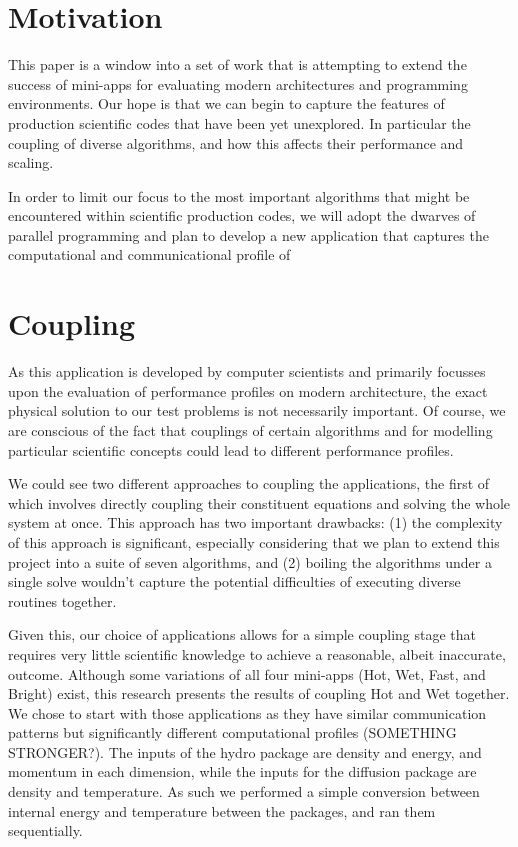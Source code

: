 \documentclass[runningheads,a4paper]{llncs}
\begin{document}
\section{Motivation}

This paper is a window into a set of work that is attempting to extend the success of mini-apps for evaluating modern architectures and programming environments. Our hope is that we can begin to capture the features of production scientific codes that have been yet unexplored. In particular the coupling of diverse algorithms, and how this affects their performance and scaling.

In order to limit our focus to the most important algorithms that might be encountered within scientific production codes, we will adopt the dwarves of parallel programming and plan to develop a new application that captures the computational and communicational profile of  

\section{Coupling}

As this application is developed by computer scientists and primarily focusses upon the evaluation of performance profiles on modern architecture, the exact physical solution to our test problems is not necessarily important. Of course, we are conscious of the fact that couplings of certain algorithms and for modelling particular scientific concepts could lead to different performance profiles.

We could see two different approaches to coupling the applications, the first of which involves directly coupling their constituent equations and solving the whole system at once. This approach has two important drawbacks: (1) the complexity of this approach is significant, especially considering that we plan to extend this project into a suite of seven algorithms, and (2) boiling the algorithms under a single solve wouldn't capture the potential difficulties of executing diverse routines together.

Given this, our choice of applications allows for a simple coupling stage that requires very little scientific knowledge to achieve a reasonable, albeit inaccurate, outcome. Although some variations of all four mini-apps (Hot, Wet, Fast, and Bright) exist, this research presents the results of coupling Hot and Wet together. We chose to start with those applications as they have similar communication patterns but significantly different computational profiles (SOMETHING STRONGER?). The inputs of the hydro package are density and energy, and momentum in each dimension, while the inputs for the diffusion package are density and temperature. As such we performed a simple conversion between internal energy and temperature between the packages, and ran them sequentially.
\end{document}
